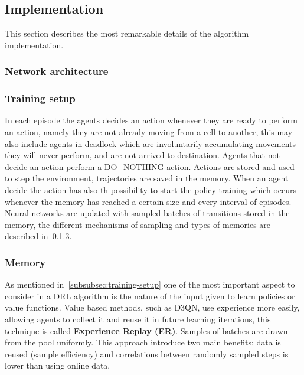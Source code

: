 \documentclass[11pt, a4paper, hidelinks]{report}
\begin{document}
\subsection{Implementation}\label{subsec:implementation2}

This section describes the most remarkable details of the algorithm implementation.

\subsubsection{Network architecture}


\subsubsection{Training setup}

In each episode the agents decides an action whenever they are ready to perform an action, namely they are not already moving from a cell to another, this may also include agents in deadlock which are involuntarily accumulating movements they will never perform, and are not arrived to destination.
Agents that not decide an action perform a DO\_NOTHING action.
Actions are stored and used to step the environment, trajectories are saved in the memory.
When an agent decide the action has also th possibility to start the policy training which occurs whenever the memory has reached a certain size and every interval of episodes.
Neural networks are updated with sampled batches of transitions stored in the memory, the different mechanisms of sampling and types of memories are described in~\ref{subsubsec:memory}.

\subsubsection{Memory}\label{subsubsec:memory}

As mentioned in~\ref{subsubsec:training-setup} one of the most important aspect to consider in a DRL algorithm is the nature of the input given to learn policies or value functions.
Value based methods, such as D3QN, use experience more easily, allowing agents to collect it and reuse it in future learning iterations, this technique is called \textbf{Experience Replay (ER)}.
Samples of batches are drawn from the pool uniformly.
This approach introduce two main benefits: data is reused (sample efficiency) and correlations between randomly sampled steps is lower than using online data.
\end{document}
